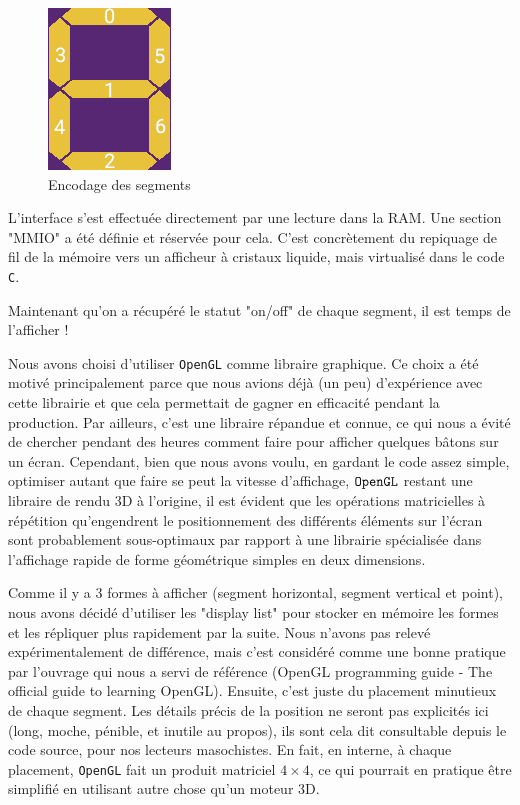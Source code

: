 \documentclass[10pt,a4paper,notitlepage ]{report}
\begin{document}
	\begin{figure}[h]
		\centering
		\includegraphics[width=0.3\linewidth]{segments}
		\caption{Encodage des segments}
		\label{fig:segments}
	\end{figure}
	
	L'interface s'est effectuée directement par une lecture dans la RAM. Une section "MMIO" a été définie et réservée pour cela. C'est concrètement du repiquage de fil de la mémoire vers un afficheur à cristaux liquide, mais virtualisé dans le code \texttt{C}.
	
	Maintenant qu'on a récupéré le statut "on/off" de chaque segment, il est temps de l'afficher !
	
	Nous avons choisi d'utiliser \texttt{OpenGL} comme libraire graphique. Ce choix a été motivé principalement parce que nous avions déjà (un peu) d'expérience avec cette librairie et que cela permettait de gagner en efficacité pendant la production. Par ailleurs, c'est une libraire répandue et connue, ce qui nous a évité de chercher pendant des heures comment faire pour afficher quelques bâtons sur un écran. Cependant, bien que nous avons voulu, en gardant le code assez simple, optimiser autant que faire se peut la vitesse d'affichage, $\tt{OpenGL}$ restant une libraire de rendu 3D à l'origine, il est évident que les opérations matricielles à répétition qu'engendrent le positionnement des différents éléments sur l'écran sont probablement sous-optimaux par rapport à une librairie spécialisée dans l'affichage rapide de forme géométrique simples en deux dimensions.
	
	Comme il y a 3 formes à afficher (segment horizontal, segment vertical et point), nous avons décidé d'utiliser les "display list" pour stocker en mémoire les formes et les répliquer plus rapidement par la suite. Nous n'avons pas relevé expérimentalement de différence, mais c'est considéré comme une bonne pratique par l'ouvrage qui nous a servi de référence (OpenGL programming guide - The official guide to learning OpenGL). Ensuite, c'est juste du placement minutieux de chaque segment. Les détails précis de la position ne seront pas explicités ici (long, moche, pénible, et inutile au propos), ils sont cela dit consultable depuis le code source, pour nos lecteurs masochistes. En fait, en interne, à chaque placement, \texttt{OpenGL} fait un produit matriciel $4\times 4$, ce qui pourrait en pratique être simplifié en utilisant autre chose qu'un moteur 3D.
	
\end{document}
